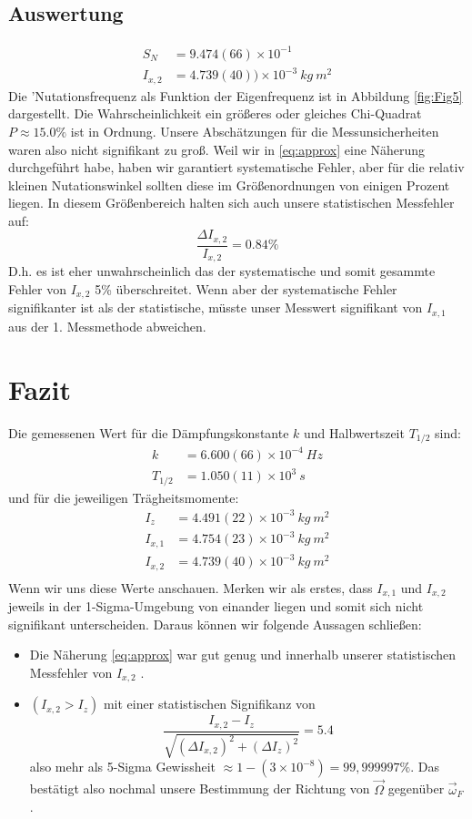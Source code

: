 \documentclass[a4paper,10pt]{article}
\begin{document}
\subsection{Auswertung}
\begin{align*}
S_{N}&=9.474(66)\times10^{-1}\\
I_{x,2}&=4.739(40))\times10^{-3}\:kg\: m^2
\end{align*}
Die 'Nutationsfrequenz als Funktion der Eigenfrequenz ist in Abbildung \ref{fig:Fig5} dargestellt.
Die Wahrscheinlichkeit ein größeres oder gleiches Chi-Quadrat \(P\approx  15.0 \%\) ist in Ordnung. Unsere Abschätzungen für die Messunsicherheiten waren also nicht signifikant zu groß. Weil wir in \eqref{eq:approx} eine Näherung durchgeführt habe, haben wir garantiert systematische Fehler, aber für die relativ kleinen Nutationswinkel sollten diese im Größenordnungen von einigen Prozent liegen. In diesem Größenbereich halten sich auch unsere statistischen Messfehler auf:
	\[\frac{\Delta I_{x,2}}{I_{x,2}} = 0.84\%\]
D.h. es ist eher unwahrscheinlich das der systematische und somit gesammte Fehler von \( I_{x,2}\) 5\% überschreitet. Wenn aber der systematische Fehler signifikanter ist als der statistische, müsste unser Messwert signifikant von \( I_{x,1}\) aus der 1. Messmethode abweichen.

\section{Fazit}
Die gemessenen Wert für die Dämpfungskonstante \(k\) und Halbwertszeit \(T_{1/2}\) sind:
\begin{align*}
k&=6.600(66)\times10^{-4}\: Hz\\
T_{1/2}&=1.050(11)\times10^{3}\:s
\end{align*}
und für die jeweiligen Trägheitsmomente:
\begin{align*}
I_z &=4.491(22)\times10^{-3}\: kg\: m^2\\
I_{x,1}&=4.754(23)\times10^{-3}\:kg\: m^2\\
I_{x,2}&=4.739(40)\times10^{-3}\:kg\: m^2\\
\end{align*}
Wenn wir uns diese Werte anschauen. Merken wir als erstes, dass  \( I_{x,1}\) und  \( I_{x,2}\) jeweils in der 1-Sigma-Umgebung von einander liegen und somit sich nicht signifikant unterscheiden. Daraus können wir folgende Aussagen schließen: 
\begin{itemize}
\item Die Näherung \eqref{eq:approx}  war gut genug und innerhalb unserer statistischen Messfehler von \( I_{x,2}\) .
\item
\(( I_{x,2}> I_{z})\) mit einer statistischen Signifikanz von \[\frac{ I_{x,2}- I_{z}}{\sqrt{(\Delta  I_{x,2})^2+(\Delta  I_{z})^2}}= 5.4\]
also mehr als 5-Sigma Gewissheit \(\approx1-\left(3\times 10^{-8}\right)=99,999997\%\). Das bestätigt also nochmal unsere Bestimmung 
der Richtung von \(\vec{\Omega}\) gegenüber \(\vec{\omega}_F\).
\end{itemize}
\unboldmath
\end{document}
